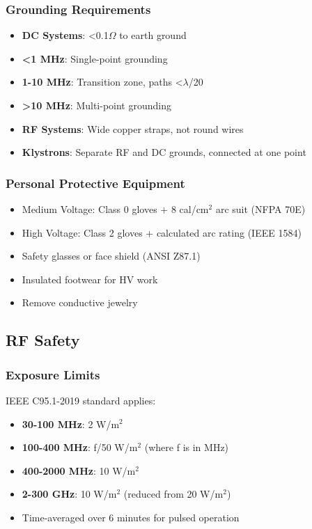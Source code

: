 \subsubsection{Grounding Requirements}
\label{sec:grounding}
\begin{itemize}[noitemsep]
    \item \textbf{DC Systems}: <0.1$\Omega$ to earth ground
    \item \textbf{<1 MHz}: Single-point grounding
    \item \textbf{1-10 MHz}: Transition zone, paths <$\lambda$/20
    \item \textbf{>10 MHz}: Multi-point grounding
    \item \textbf{RF Systems}: Wide copper straps, not round wires
    \item \textbf{Klystrons}: Separate RF and DC grounds, connected at one point
\end{itemize}

\subsubsection{Personal Protective Equipment}
\begin{itemize}[noitemsep]
    \item Medium Voltage: Class 0 gloves + 8 cal/cm$^2$ arc suit (NFPA 70E)
    \item High Voltage: Class 2 gloves + calculated arc rating (IEEE 1584)
    \item Safety glasses or face shield (ANSI Z87.1)
    \item Insulated footwear for HV work
    \item Remove conductive jewelry
\end{itemize}

\subsection{RF Safety}

\subsubsection{Exposure Limits}
IEEE C95.1-2019 standard applies:
\begin{itemize}[noitemsep]
    \item \textbf{30-100 MHz}: 2 W/m$^2$
    \item \textbf{100-400 MHz}: f/50 W/m$^2$ (where f is in MHz)
    \item \textbf{400-2000 MHz}: 10 W/m$^2$
    \item \textbf{2-300 GHz}: 10 W/m$^2$ (reduced from 20 W/m$^2$)
    \item Time-averaged over 6 minutes for pulsed operation
\end{itemize}

